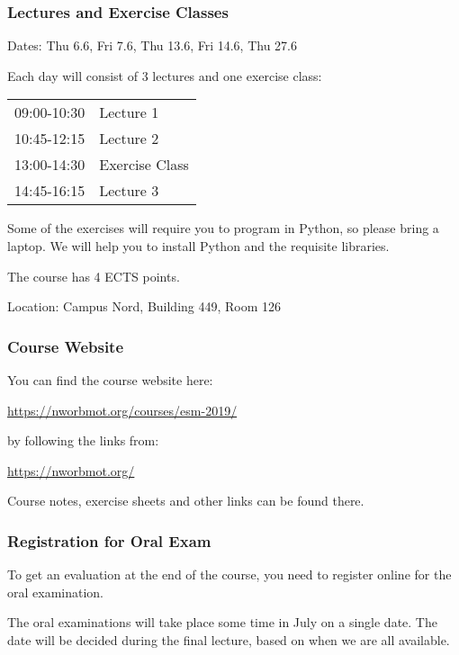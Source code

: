 \documentclass[10pt,aspectratio=169,dvipsnames]{beamer}
\begin{document}
\begin{frame}
  \frametitle{Lectures and Exercise Classes}

  \alert{Dates:} Thu 6.6, Fri 7.6, Thu 13.6, Fri 14.6, Thu 27.6

  Each day will consist of 3 lectures and one exercise class:

  \vspace{.2cm}

  \centering
  \begin{tabular}{@{} p{3cm}p{6cm} @{}}

  09:00-10:30 & Lecture 1 \\
  10:45-12:15 & Lecture 2 \\
  13:00-14:30 & Exercise Class \\
  14:45-16:15 & Lecture 3 \\
\end{tabular}

  \vspace{.2cm}
  \raggedright

  Some of the exercises will require you to program in Python, so
  please bring a laptop. We will help you to install Python and the
  requisite libraries.

  \vspace{.2cm}

  The course has 4 ECTS points.

  \vspace{.2cm}



  \alert{Location:} Campus Nord, Building 449, Room 126



\end{frame}


\begin{frame}
  \frametitle{Course Website}

  You can find the course website here:

  \url{https://nworbmot.org/courses/esm-2019/}

  by following the links from:

  \url{https://nworbmot.org/}

  Course notes, exercise sheets and other links can be found there.

\end{frame}




\begin{frame}
  \frametitle{Registration for Oral Exam}

  To get an evaluation at the end of the course, you need to register
  online for the oral examination.

  The oral examinations will take place some time in July on a
  single date. The date will be decided during the final lecture,
  based on when we are all available.

\end{frame}
\end{document}
